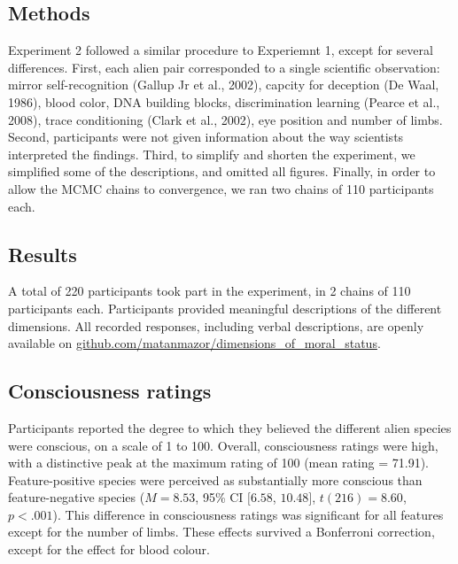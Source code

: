 \documentclass[10pt, letterpaper]{article}
\begin{document}
\hypertarget{methods-1}{%
\subsection{Methods}\label{methods-1}}

Experiment 2 followed a similar procedure to Experiemnt 1, except for
several differences. First, each alien pair corresponded to a single
scientific observation: mirror self-recognition (Gallup Jr et al.,
2002), capcity for deception (De Waal, 1986), blood color, DNA building
blocks, discrimination learning (Pearce et al., 2008), trace
conditioning (Clark et al., 2002), eye position and number of limbs.
Second, participants were not given information about the way scientists
interpreted the findings. Third, to simplify and shorten the experiment,
we simplified some of the descriptions, and omitted all figures.
Finally, in order to allow the MCMC chains to convergence, we ran two
chains of 110 participants each.

\hypertarget{results-1}{%
\subsection{Results}\label{results-1}}

A total of 220 participants took part in the experiment, in 2 chains of
110 participants each. Participants provided meaningful descriptions of
the different dimensions. All recorded responses, including verbal
descriptions, are openly available on
\href{https://github.com/matanmazor/dimensions_of_moral_status}{github.com/matanmazor/dimensions\_of\_moral\_status}.

\hypertarget{consciousness-ratings-1}{%
\subsection{Consciousness ratings}\label{consciousness-ratings-1}}

Participants reported the degree to which they believed the different
alien species were conscious, on a scale of 1 to 100. Overall,
consciousness ratings were high, with a distinctive peak at the maximum
rating of 100 (mean rating = 71.91). Feature-positive species were
perceived as substantially more conscious than feature-negative species
(\(M = 8.53\), 95\% CI \([6.58\), \(10.48]\), \(t(216) = 8.60\),
\(p < .001\)). This difference in consciousness ratings was significant
for all features except for the number of limbs. These effects survived
a Bonferroni correction, except for the effect for blood colour.
\end{document}
